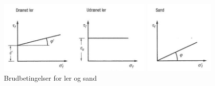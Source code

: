 \begin{figure}[htbp] \centering
	\begin{minipage}[b]{0.48\textwidth}\centering
		\includegraphics[width=1.0\textwidth]{billeder/friktionsvinkeller.png}
		\caption{Brudbetingelser for ler og sand \citep{geoteknik}}
		\label{fig:friktionsvinkler}
	\end{minipage}\hfill
\end{figure}

